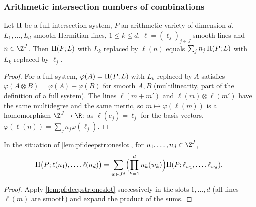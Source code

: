 \subsubsection*{Arithmetic intersection numbers of combinations}

\begin{lemma}\label{lem:pf:deepstr:oneslot}
Let $\mathrm{II}$ be a full intersection system, $P$ an arithmetic variety of dimension $d$, $L_1,\dots,L_d$
smooth Hermitian lines, $1\le k\le d$, $\ell=(\ell_j)_{j\in J}$ smooth lines and $n\in\Z^J$. Then
$\mathrm{II}(P;L)$ with $L_k$ replaced by $\ell(n)$ equals $\sum_jn_j\,\mathrm{II}(P;L)$ with $L_k$ replaced by $\ell_j$.
\end{lemma}

\begin{proof}
For a full system, $\varphi(A)=\mathrm{II}(P;L)$ with $L_k$ replaced by $A$ satisfies $\varphi(A\otimes B)=\varphi(A)+\varphi(B)$
for smooth $A,B$ (multilinearity, part of the definition of a full system). The lines $\ell(m+m')$ and
$\ell(m)\otimes\ell(m')$ have the same multidegree and the same metric, so $m\mapsto\varphi(\ell(m))$ is a homomorphism
$\Z^J\to\R$; as $\ell(e_j)=\ell_j$ for the basis vectors, $\varphi(\ell(n))=\sum_jn_j\varphi(\ell_j)$.
\end{proof}

\begin{corollary}[Expansion]\label{cor:pf:deepstr:expansion}
In the situation of \cref{lem:pf:deepstr:oneslot}, for $n_1,\dots,n_d\in\Z^J$,
\[
\mathrm{II}\bigl(P;\ell(n_1),\dots,\ell(n_d)\bigr)=\sum_{w\in J^d}\Bigl(\prod_{k=1}^dn_k(w_k)\Bigr)\mathrm{II}(P;\ell_{w_1},\dots,\ell_{w_d}).
\]
\end{corollary}

\begin{proof}
Apply \cref{lem:pf:deepstr:oneslot} successively in the slots $1,\dots,d$ (all lines $\ell(m)$ are smooth) and
expand the product of the sums.
\end{proof}

